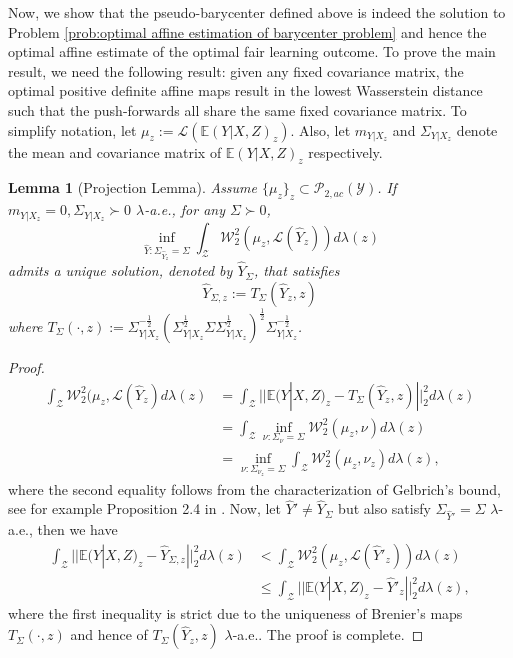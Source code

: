 \documentclass[twoside,11pt]{article}
\newtheorem{lem}{Lemma}[section]{\bfseries}{\itshape}
\begin{document}
Now, we show that the pseudo-barycenter defined above is indeed the solution to Problem \ref{prob:optimal affine estimation of barycenter problem} and hence the optimal affine estimate of the optimal fair learning outcome. To prove the main result, we need the following result: given any fixed covariance matrix, the optimal positive definite affine maps result in the lowest Wasserstein distance such that the push-forwards all share the same fixed covariance matrix. To simplify notation, let $\mu_z := \mathcal{L}(\mathbb{E}(Y|X,Z)_z)$. Also, let $m_{Y|X_z}$ and $\Sigma_{Y|X_z}$ denote the mean and covariance matrix of $\mathbb{E}(Y|X,Z)_z$ respectively.

\begin{lem}[Projection Lemma] \label{l:Projection Lemma}
Assume $\{\mu_z\}_z \subset \mathcal{P}_{2,ac}(\mathcal{Y})$. If $m_{Y|X_z} = 0, \Sigma_{Y|X_z} \succ 0$ $\lambda$-a.e., for any $\Sigma \succ 0$,
\begin{equation}
\inf_{\hat{Y}: \Sigma_{\hat{Y}_z} = \Sigma} \int_{\mathcal{Z}} \mathcal{W}^2_2(\mu_z,  \mathcal{L}(\hat{Y}_z)) d\lambda(z)
\end{equation}
admits a unique solution, denoted by $\hat{Y}_{\Sigma}$, that satisfies
\begin{equation}
\hat{Y}_{\Sigma,z} := T_{\Sigma}(\hat{Y}_z,z)
\end{equation}
where $T_{\Sigma}(\cdot,z) := \Sigma_{Y|X_z}^{-\frac{1}{2}} (\Sigma_{Y|X_z}^{\frac{1}{2}} \Sigma  \Sigma_{Y|X_z}^{\frac{1}{2}})^{\frac{1}{2}} \Sigma_{Y|X_z}^{-\frac{1}{2}}$.
\end{lem}

\begin{proof}
\begin{align*}
\int_{\mathcal{Z}} \mathcal{W}^2_2(\mu_z,  \mathcal{L}(\hat{Y}_z) d\lambda(z) & =  \int_{\mathcal{Z}} ||\mathbb{E}(Y|X,Z)_z - T_{\Sigma}(\hat{Y}_z,z)||^2_2 d\lambda(z)\\
& = \int_{\mathcal{Z}} \inf_{\nu: \Sigma_{\nu} = \Sigma} \mathcal{W}_2^2(\mu_z,\nu) d\lambda(z)\\
& = \inf_{\nu: \Sigma_{\nu_z} = \Sigma} \int_{\mathcal{Z}} \mathcal{W}_2^2(\mu_z,\nu_z) d\lambda(z),
\end{align*}
where the second equality follows from the characterization of Gelbrich's bound, see for example Proposition 2.4 in \cite{cuesta1996lower}. Now, let $\hat{Y}' \neq \hat{Y}_{\Sigma}$ but also satisfy $\Sigma_{\hat{Y}'} = \Sigma$ $\lambda$-a.e., then we have
\begin{align*}
\int_{\mathcal{Z}} ||\mathbb{E}(Y|X,Z)_z - \hat{Y}_{\Sigma,z}||^2_2 d\lambda(z) & <  \int_{\mathcal{Z}} \mathcal{W}_2^2(\mu_z,\mathcal{L}(\hat{Y}'_z)) d\lambda(z)\\
& \leq \int_{\mathcal{Z}} || \mathbb{E}(Y|X,Z)_z - \hat{Y}'_z||^2_2 d\lambda(z),
\end{align*}
where the first inequality is strict due to the uniqueness of Brenier's maps $T_{\Sigma}(\cdot,z)$ and hence of $T_{\Sigma}(\hat{Y}_z,z)$ $\lambda$-a.e.. The proof is complete.
\end{proof}
\end{document}
